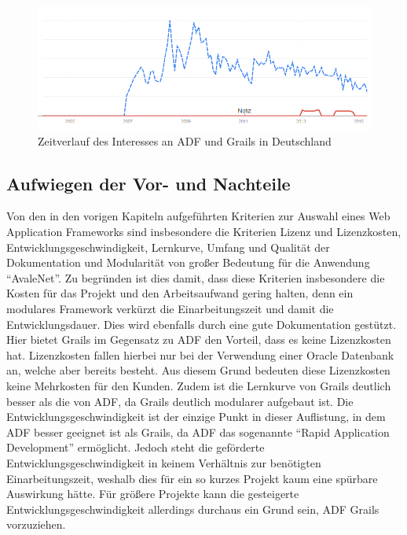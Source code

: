 \begin{figure}
\centering
\includegraphics[width=\textwidth]{img/interesse_de.png}
\caption{Zeitverlauf des Interesses an ADF und Grails in Deutschland \autocite{GT2015}}
\label{fig:gtd15}
\end{figure}

\subsection{Aufwiegen der Vor- und Nachteile}
\label{sec:gewichtung}
Von den in den vorigen Kapiteln aufgeführten Kriterien zur Auswahl eines Web Application Frameworks sind insbesondere die Kriterien Lizenz und Lizenzkosten, Entwicklungsgeschwindigkeit, Lernkurve, Umfang und Qualität der Dokumentation und Modularität von großer Bedeutung für die Anwendung "`AvaleNet"'. Zu begründen ist dies damit, dass diese Kriterien insbesondere die Kosten für das Projekt und den Arbeitsaufwand gering halten, denn ein modulares Framework verkürzt die Einarbeitungszeit und damit die Entwicklungsdauer. Dies wird ebenfalls durch eine gute Dokumentation gestützt. Hier bietet Grails im Gegensatz zu ADF den Vorteil, dass es keine Lizenzkosten  hat. Lizenzkosten fallen hierbei nur bei der Verwendung einer Oracle Datenbank an, welche aber bereits besteht. Aus diesem Grund bedeuten diese Lizenzkosten keine Mehrkosten für den Kunden. Zudem ist die Lernkurve von Grails deutlich besser als die von ADF, da Grails deutlich modularer aufgebaut ist. Die Entwicklungsgeschwindigkeit ist der einzige Punkt in dieser Auflistung, in dem ADF besser geeignet ist als Grails, da ADF das sogenannte "`Rapid Application Development"' ermöglicht. Jedoch steht die geförderte Entwicklungsgeschwindigkeit in keinem Verhältnis zur benötigten Einarbeitungszeit, weshalb dies für ein so kurzes Projekt kaum eine spürbare Auswirkung hätte. Für größere Projekte kann die gesteigerte Entwicklungsgeschwindigkeit allerdings durchaus ein Grund sein, ADF Grails vorzuziehen. \\

